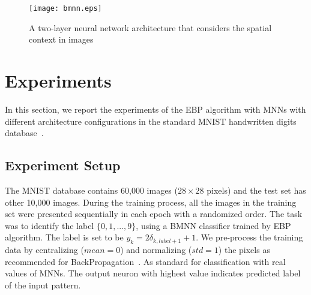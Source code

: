 \documentclass{article} %
\begin{document}
\begin{figure}[h]
\begin{center}
\texttt{[image: bmnn.eps]}
\end{center}
\caption{A two-layer neural network architecture that considers the spatial context in images}
\label{fig:2d}
\end{figure}
\section{Experiments}
In this section, we report the experiments of the EBP algorithm with MNNs with different architecture configurations in the standard MNIST handwritten digits database~\citep{lecun1998gradient}.

\subsection{Experiment Setup}
The MNIST database contains 60,000 images ($28 \times 28$ pixels) and the test set has other 10,000 images. During the training process, all the images in the training set were presented sequentially in each epoch with a randomized order. The task was to identify the label $\{0,1,...,9\}$, using a BMNN classifier trained by EBP algorithm. The label is set to be $y_k = 2\delta_{k,label+1} + 1$. We pre-process the training data by centralizing ($mean=0$) and normalizing ($std=1$) the pixels as recommended for BackPropagation~\citep{lecun2012efficient}.  As standard for classification with real values of MNNs. The output neuron with highest value indicates predicted label of the input pattern.
\end{document}
